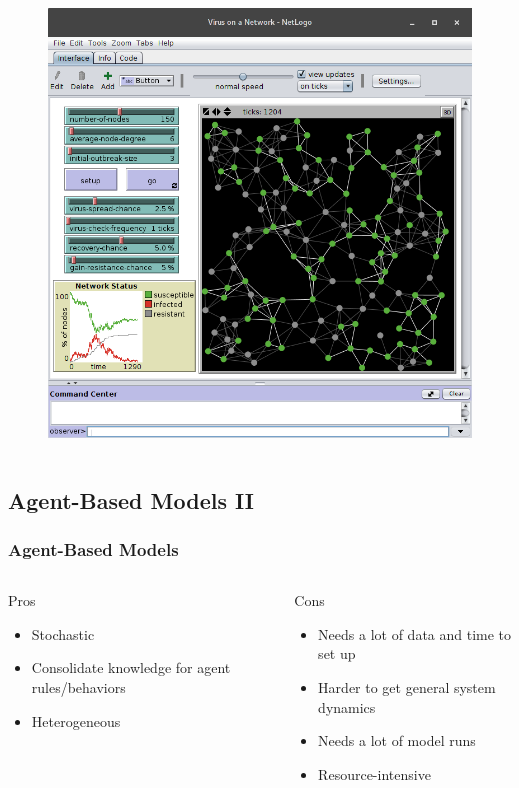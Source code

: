 \documentclass[compress]{beamer}
\begin{document}
\begin{frame}[Blank]
\begin{columns}
\begin{column}{0.6\textwidth}
                \begin{figure}
                    \includegraphics[width=0.77\linewidth]{../figures/netlogo_virus_on_a_network}
                    \caption{}
                    \label{fig:netlogovirusonanetwork}
                \end{figure}
            \end{column}
        \end{columns}
    \end{frame}

\subsection{Agent-Based Models II}

\begin{frame}[Basic2] \frametitle{Agent-Based Models}
    \begin{columns}
        \begin{column}{0.5\textwidth}
            Pros
            \begin{itemize}
                \item Stochastic
                \item Consolidate knowledge for agent rules/behaviors
                \item Heterogeneous
            \end{itemize}
        \end{column}
        \begin{column}{0.5\textwidth}
            Cons
            \begin{itemize}
                \item Needs a lot of data and time to set up
                \item Harder to get general system dynamics
                \item Needs a lot of model runs
                \item Resource-intensive
            \end{itemize}
        \end{column}
    \end{columns}
\end{frame}
\end{document}

